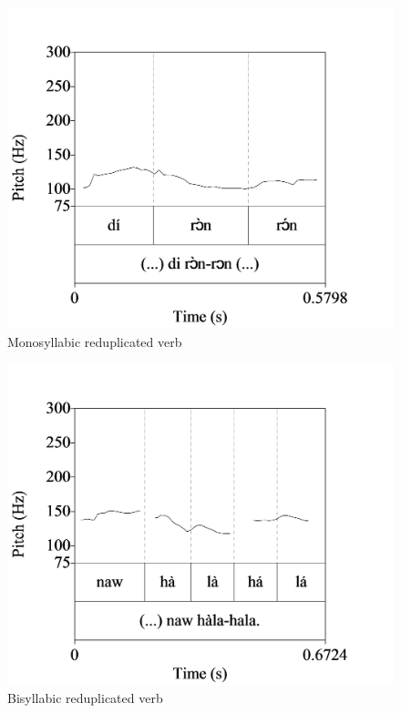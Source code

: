 \begin{figure}
\caption{Monosyllabic reduplicated verb}
\label{fig:key:3.21}
\includegraphics[height=.3\textheight]{figures/yakpomod-img23.png}
\end{figure}

\begin{figure}
\caption{Bisyllabic reduplicated verb}
\label{fig:key:3.22} 
\includegraphics[height=.3\textheight]{figures/yakpomod-img24.png} 
\end{figure}
 
